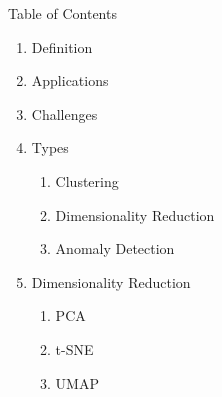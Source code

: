\begin{frame}[allowframebreaks]{Table of Contents}
\begin{enumerate}
    \item Definition
    \item Applications
    \item Challenges
    \item Types
        \begin{enumerate}
            \item Clustering
            \item Dimensionality Reduction
            \item Anomaly Detection
        \end{enumerate}
    \item Dimensionality Reduction
        \begin{enumerate}
            \item PCA
            \item t-SNE
            \item UMAP
        \end{enumerate}
\end{enumerate}
\end{frame}